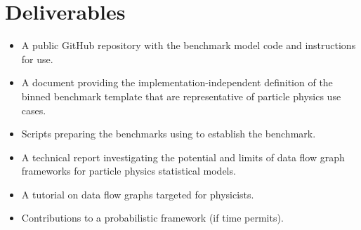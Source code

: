 \section{Deliverables}

\begin{itemize}
	\item A public GitHub repository with the benchmark model code and instructions for use.
	\item A document providing the implementation-independent definition of the binned benchmark template that are representative of particle physics use cases.
	\item Scripts preparing the benchmarks using  to establish the  benchmark.
	\item A technical report investigating the potential and limits of data flow graph frameworks for particle physics statistical models.
	\item A tutorial on data flow graphs targeted for physicists.
	\item Contributions to a probabilistic framework (if time permits).
\end{itemize}
